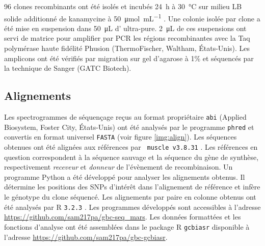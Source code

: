 96 clones recombinants ont été isolés et incubés \SI{24}{\hour} à
\SI{30}{\celsius} sur milieu LB solide additionné de kanamycine à
\SI{50}{\umol\per\mL} . Une colonie isolée par clone a été mise en suspension
dans \SI{50}{\uL} d' ultra-pure. \SI{2}{\uL} de ces suspensions ont
servi de matrice pour amplifier par PCR les régions recombinantes avec la Taq
polymérase haute fidélité Phusion (ThermoFischer, Waltham, États-Unis). Les
amplicons ont été vérifiés par migration sur gel d'agarose à 1\% et séquencés
par la technique de Sanger\cite{sanger_dna_1977} (GATC Biotech).


\newpage

\subsection{Alignements}
\label{subsec:align}

Les spectrogrammes de séquençage reçus au format propriétaire \texttt{abi}
(Applied Biosystem, Foster City, États-Unis) ont été analysés par le programme
\texttt{phred} \cite{ewing_base-calling_1998} et convertis en format universel
\texttt{FASTA} (voir figure \ref{img:align}). Les séquences obtenues ont été
alignées aux références par \texttt{ muscle v3.8.31} \cite{edgar_muscle:_2004}.
Les références en question correspondent à la séquence sauvage et la séquence du
gène de synthèse, respectivement \emph{receveur} et \emph{donneur} de
l'évènement de recombinaison. Un programme Python \cite{cock_biopython:_2009} a
été développé pour analyser les alignements obtenus. Il détermine les positions
des SNPs d'intérêt dans l'alignement de référence et infère le génotype du clone
séquencé. Les alignements par paire en colonne obtenus ont été analysés par
\textrm{R} \texttt{3.2.3} \cite{r_core_team_r:_2015}. Les programmes développés
sont accessibles à l'adresse \url{https://github.com/sam217pa/gbc-seq_mars}. Les
données formattées et les fonctions d'analyse ont été assemblées dans le package
\textrm{R} \texttt{gcbiasr} disponible à l'adresse
\url{https://github.com/sam217pa/gbc-gcbiasr}.
